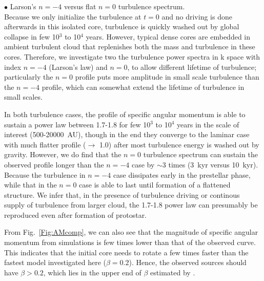\noindent $\bullet$ Larson's $n=-4$ versus flat $n=0$ turbulence spectrum.\\
Because we only initialize the turbulence at $t=0$ and no driving
is done afterwards in this isolated core, turbulence is quickly
washed out by global collapse in few 10$^3$ to 10$^4$ years. However, typical
dense cores are embedded in ambient turbulent cloud that replenishes
both the mass and turbulence in these cores.
Therefore, we investigate two the turbulence power spectra in k space
with index $n=-4$ (Larson's law) and $n=0$, to allow different lifetime
of turbulence; particularly the $n=0$ profile puts more amplitude in
small scale turbulence than the $n=-4$ profile, which can somewhat
extend the lifetime of turbulence in small scales.

In both turbulence cases, the profile of specific angular momentum
is able to sustain a power law between 1.7-1.8 for few 10$^3$ to 10$^4$ years
in the scale of interest (500-20000~AU), though in the end they
converge to the laminar case with much flatter profile ($\rightarrow$ 1.0)
after most turbulence energy is washed out by gravity.
However, we do find that the $n=0$ turbulence spectrum can sustain the
observed profile longer than the $n=-4$ case by $\sim$3 times
(3~kyr versus 10~kyr). Because the turbulence in $n=-4$ case dissipates
early in the prestellar phase, while that in the $n=0$ case is
able to last until formation of a flattened structure.
We infer that, in the presence of turbulence driving or continous supply
of turbulence from larger cloud, the 1.7-1.8 power law can presumably be
reproduced even after formation of protostar.

From Fig.~\ref{Fig:AMcomp}, we can also see that the magnitude of
specific angular momentum from simulations is few times lower than
that of the observed curve. This indicates that the initial core needs
to rotate a few times faster than the fastest model investigated here
($\beta=0.2$). Hence, the observed sources should have $\beta>0.2$, which
lies in the upper end of $\beta$ estimated by \citet{Goodman_1993}.


  

  
  